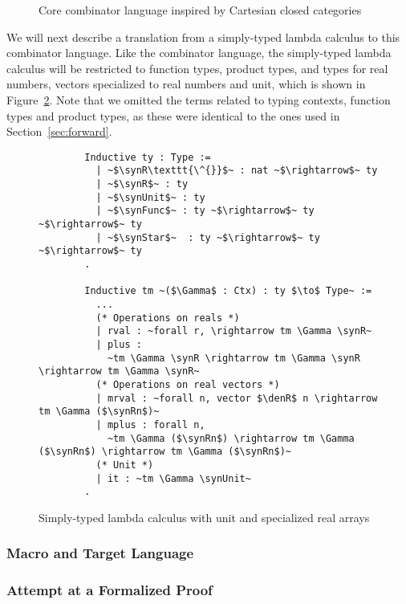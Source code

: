     \begin{figure}[]
      \centering

      \caption{Core combinator language inspired by Cartesian closed categories}
      \label{fig:combinator_core_lang}
    \end{figure}

    We will next describe a translation from a simply-typed lambda calculus to this combinator language.
    Like the combinator language, the simply-typed lambda calculus will be restricted to function types, product types, and types for real numbers, vectors specialized to real numbers and unit, which is shown in Figure~\ref{fig:stlc_combinator}. Note that we omitted the terms related to typing contexts, function types and product types, as these were identical to the ones used in Section~\ref{sec:forward}.

    \begin{figure}
      \centering
      \begin{verbatim}
        Inductive ty : Type :=
          | ~$\synR\texttt{\^{}}$~ : nat ~$\rightarrow$~ ty
          | ~$\synR$~ : ty
          | ~$\synUnit$~ : ty
          | ~$\synFunc$~ : ty ~$\rightarrow$~ ty ~$\rightarrow$~ ty
          | ~$\synStar$~  : ty ~$\rightarrow$~ ty ~$\rightarrow$~ ty
        .

        Inductive tm ~($\Gamma$ : Ctx) : ty $\to$ Type~ :=
          ...
          (* Operations on reals *)
          | rval : ~forall r, \rightarrow tm \Gamma \synR~
          | plus :
            ~tm \Gamma \synR \rightarrow tm \Gamma \synR \rightarrow tm \Gamma \synR~
          (* Operations on real vectors *)
          | mrval : ~forall n, vector $\denR$ n \rightarrow tm \Gamma ($\synRn$)~
          | mplus : forall n,
            ~tm \Gamma ($\synRn$) \rightarrow tm \Gamma ($\synRn$) \rightarrow tm \Gamma ($\synRn$)~
          (* Unit *)
          | it : ~tm \Gamma \synUnit~
        .
      \end{verbatim}
      \caption{Simply-typed lambda calculus with unit and specialized real arrays}
      \label{fig:stlc_combinator}
    \end{figure}
  \subsubsection{Macro and Target Language}\label{sec:combinator-macro}
  \subsubsection{Attempt at a Formalized Proof}\label{sec:combinator-proof}
